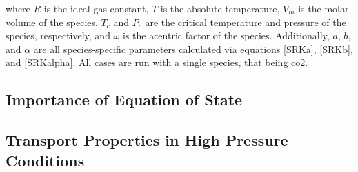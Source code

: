 where $R$ is the ideal gas constant, $T$ is the absolute temperature, $V_m$ is the molar volume of the species, $T_c$ and $P_c$ are the critical temperature and pressure of the species, respectively, and $\omega$ is the acentric factor of the species. Additionally, $a$, $b$, and $\alpha$ are all species-specific parameters calculated via equations \ref{SRKa}, \ref{SRKb}, and \ref{SRKalpha}. All cases are run with a single species, that being \gls{co2}.

\subsection{Importance of Equation of State}
\subsection{Transport Properties in High Pressure Conditions}




